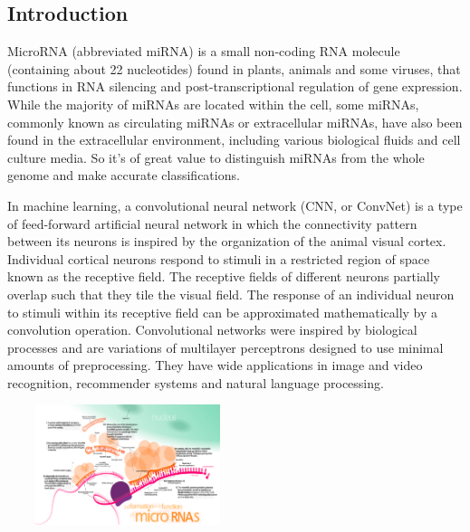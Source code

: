 \documentclass[letterpaper, 11pt]{article}
\newenvironment{Figure}
  {\par\medskip\noindent\minipage{\linewidth}}
  {\endminipage\par\medskip}
\begin{document}
\begin{multicols*}{2}
\section{Introduction}
{
MicroRNA (abbreviated miRNA) is a small non-coding RNA molecule (containing about 22 nucleotides) found in plants, animals and some viruses, that functions in RNA silencing and post-transcriptional regulation of gene expression. While the majority of miRNAs are located within the cell, some miRNAs, commonly known as circulating miRNAs or extracellular miRNAs, have also been found in the extracellular environment, including various biological fluids and cell culture media. So it's of great value to distinguish miRNAs from the whole genome and make accurate classifications.
~\cite{miRNA}

In machine learning, a convolutional neural network (CNN, or ConvNet) is a type of feed-forward artificial neural network in which the connectivity pattern between its neurons is inspired by the organization of the animal visual cortex. Individual cortical neurons respond to stimuli in a restricted region of space known as the receptive field. The receptive fields of different neurons partially overlap such that they tile the visual field. The response of an individual neuron to stimuli within its receptive field can be approximated mathematically by a convolution operation. Convolutional networks were inspired by biological processes and are variations of multilayer perceptrons designed to use minimal amounts of preprocessing. They have wide applications in image and video recognition, recommender systems and natural language processing.
~\cite{Convolutional-deep-belief}
~\cite{CNN}
\begin{Figure}
\includegraphics[height = 3.5cm, width = 7cm]{miRNA.png}
\end{Figure}

}
\end{multicols*}
\end{document}
